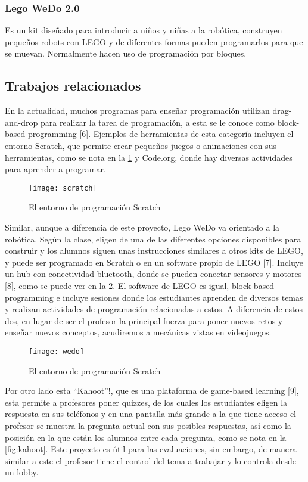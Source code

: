 \subsubsection{Lego WeDo 2.0}
Es un kit diseñado para introducir a niños y niñas a la robótica, 
construyen pequeños robots con LEGO y de diferentes 
formas pueden programarlos para que se muevan. 
Normalmente hacen uso de programación por bloques.

\subsection{Trabajos relacionados}
En la actualidad, muchos programas para enseñar programación utilizan 
drag-and-drop para realizar la tarea de programación, 
a esta se le conoce como block-based programming [6]. 
Ejemplos de herramientas de esta categoría incluyen el entorno Scratch, 
que permite crear pequeños juegos o animaciones con sus herramientas, 
como se nota en la \ref{fig:scratch_scrn} y Code.org, donde hay diversas actividades 
para aprender a programar.

\begin{figure}
    \caption{El entorno de programación Scratch}
    \centering
    \texttt{[image: scratch]}
    \label{fig:scratch_scrn}
\end{figure}

Similar, aunque a diferencia de este proyecto, Lego WeDo va orientado a la robótica. Según la clase, eligen de una de las diferentes opciones disponibles para construir y los alumnos siguen unas instrucciones similares a otros kits de LEGO, y puede ser programado en Scratch o en un software propio de LEGO [7]. Incluye un hub con conectividad bluetooth, donde se pueden conectar sensores y motores [8], como se puede ver en la \ref{fig:wedo}. El software de LEGO es igual, block-based programming e incluye sesiones donde los estudiantes aprenden de diversos temas y realizan actividades de programación relacionadas a estos. A diferencia de estos dos, en lugar de ser el profesor la principal fuerza para poner nuevos retos y enseñar nuevos conceptos, acudiremos a mecánicas vistas en videojuegos.

\begin{figure}
    \caption{El entorno de programación Scratch}
    \centering
    \texttt{[image: wedo]}
    \label{fig:wedo}
\end{figure}

Por otro lado esta “Kahoot”!, que es una plataforma de game-based learning [9], esta permite a profesores poner quizzes, de los cuales los estudiantes eligen la respuesta en sus teléfonos y en una pantalla más grande a la que tiene acceso el profesor se muestra la pregunta actual con sus posibles respuestas, así como la posición en la que están los alumnos entre cada pregunta, como se nota en la \ref{fig:kahoot}. Este proyecto es útil para las evaluaciones, sin embargo, de manera similar a este el profesor tiene el control del tema a trabajar y lo controla desde un lobby. 

